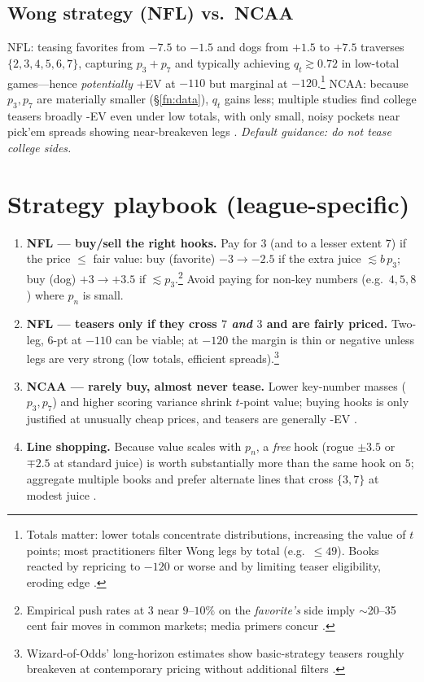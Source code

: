 \documentclass[11pt]{amsart}
\begin{document}
\subsection*{Wong strategy (NFL) vs.\ NCAA}
NFL: teasing favorites from $-7.5$ to $-1.5$ and dogs from $+1.5$ to $+7.5$ traverses $\{2,3,4,5,6,7\}$, capturing $p_3+p_7$ and typically achieving $q_t\gtrsim 0.72$ in low-total games---hence \emph{potentially} +EV at $-110$ but marginal at $-120$.\footnote{Totals matter: lower totals concentrate distributions, increasing the value of $t$ points; most practitioners filter Wong legs by total (e.g.\ $\le 49$). Books reacted by repricing to $-120$ or worse and by limiting teaser eligibility, eroding edge \cite{Wizard-Teaser,Wizard-TeaserPage}.}
NCAA: because $p_3,p_7$ are materially smaller (\S\ref{fn:data}), $q_t$ gains less; multiple studies find college teasers broadly -EV even under low totals, with only small, noisy pockets near pick’em spreads showing near-breakeven legs \cite{TheLines-CFB-TeaserStudy,TheLines-CFB-Guide}. \emph{Default guidance: do not tease college sides.}

\section{Strategy playbook (league-specific)}
\begin{enumerate}[leftmargin=2em]
\item \textbf{NFL --- buy/sell the right hooks.} Pay for $3$ (and to a lesser extent $7$) if the price $\le$ fair value: buy (favorite) $-3\to-2.5$ if the extra juice $\lesssim b\,p_3$; buy (dog) $+3\to+3.5$ if $\lesssim p_3$.\footnote{Empirical push rates at 3 near $9$--$10\%$ on the \emph{favorite’s} side imply $\sim$20--35 cent fair moves in common markets; media primers concur \cite{WaPo-Greenberg-Keys,Action-KeyNumbers-2024}.}
Avoid paying for non-key numbers (e.g.\ $4,5,8$) where $p_n$ is small.
\item \textbf{NFL --- teasers only if they cross $7$ \emph{and} $3$ and are fairly priced.} Two-leg, 6-pt at $-110$ can be viable; at $-120$ the margin is thin or negative unless legs are very strong (low totals, efficient spreads).\footnote{Wizard-of-Odds’ long-horizon estimates show basic-strategy teasers roughly breakeven at contemporary pricing without additional filters \cite{Wizard-TeaserPage}.}
\item \textbf{NCAA --- rarely buy, almost never tease.} Lower key-number masses ($p_3,p_7$) and higher scoring variance shrink $t$-point value; buying hooks is only justified at unusually cheap prices, and teasers are generally -EV \cite{TheLines-CFB-TeaserStudy}.
\item \textbf{Line shopping.} Because value scales with $p_n$, a \emph{free} hook (rogue $\pm3.5$ or $\mp2.5$ at standard juice) is worth substantially more than the same hook on $5$; aggregate multiple books and prefer alternate lines that cross $\{3,7\}$ at modest juice \cite{WaPo-Greenberg-Keys}.
\end{enumerate}
\end{document}
